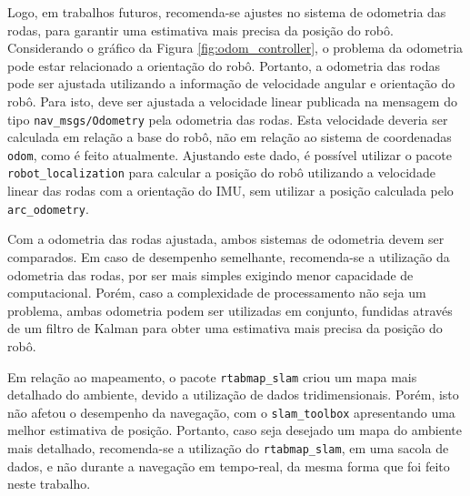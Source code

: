 \documentclass[repeatfields,xlists,xpacks,oneside,yearsonly]{ufrgscca}
\begin{document}

Logo, em trabalhos futuros, recomenda-se ajustes no sistema de
odometria das rodas, para garantir uma estimativa mais precisa da
posição do robô. Considerando o gráfico da Figura
\ref{fig:odom_controller}, o problema da odometria pode estar
relacionado a orientação do robô. Portanto, a odometria das rodas
pode ser ajustada utilizando a informação de velocidade angular e
orientação do robô. Para isto, deve ser ajustada a velocidade linear
publicada na mensagem do tipo \texttt{nav\_msgs/Odometry} pela
odometria das rodas. Esta velocidade deveria ser calculada em relação
a base do robô, não em relação ao sistema de coordenadas
\texttt{odom}, como é feito atualmente. Ajustando este dado, é
possível utilizar o pacote \texttt{robot\_localization} para calcular
a posição do robô utilizando a velocidade linear das rodas com a
orientação do IMU, sem utilizar a posição calculada pelo
\texttt{arc\_odometry}.

Com a odometria das rodas ajustada, ambos sistemas de odometria devem
ser comparados. Em caso de desempenho semelhante, recomenda-se a
utilização da odometria das rodas, por ser mais simples exigindo
menor capacidade de computacional. Porém, caso a complexidade de
processamento não seja um problema, ambas odometria podem ser
utilizadas em conjunto, fundidas através de um filtro de Kalman para
obter uma estimativa mais precisa da posição do robô.

Em relação ao mapeamento, o pacote \texttt{rtabmap\_slam} criou um
mapa mais detalhado do ambiente, devido a utilização de dados
tridimensionais. Porém, isto não afetou o desempenho da navegação,
com o \texttt{slam\_toolbox} apresentando uma melhor estimativa de
posição. Portanto, caso seja desejado um mapa do ambiente mais
detalhado, recomenda-se a utilização do \texttt{rtabmap\_slam}, em
uma sacola de dados, e não durante a navegação em tempo-real, da
mesma forma que foi feito neste trabalho.
\end{document}
